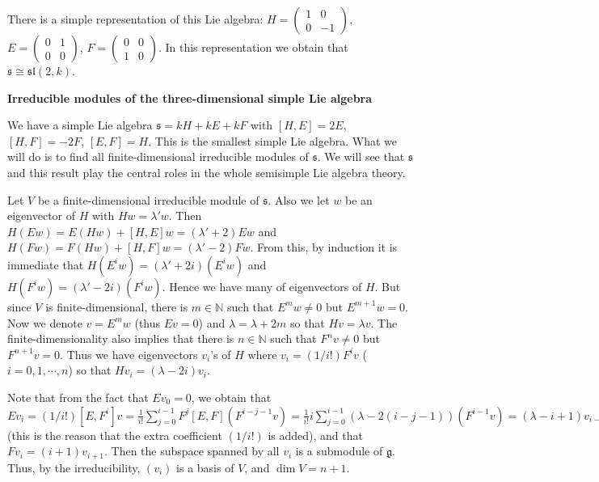 \documentclass{article}
\newcommand{\NaN}{\mathbb{N}}
\newcommand{\lie}[1]{\mathfrak{#1}}
\begin{document}
There is a simple representation of this Lie algebra: $H = \left( \begin{array}{rr} 1 & 0 \\ 0 & -1 \end{array} \right)$, $E = \left( \begin{array}{rr} 0 & 1 \\ 0 & 0 \end{array} \right)$, $F = \left( \begin{array}{rr} 0 & 0 \\ 1 & 0 \end{array} \right)$.
In this representation we obtain that $\lie{s} \cong \lie{sl}(2, k)$.

\newpage

\textbf{Irreducible modules of the three-dimensional simple Lie algebra}

We have a simple Lie algebra $\lie{s} = kH + kE + kF$ with $[H, E] = 2E$, $[H, F] = -2F$, $[E, F] = H$.
This is the smallest simple Lie algebra.
What we will do is to find all finite-dimensional irreducible modules of $\lie{s}$.
We will see that $\lie{s}$ and this result play the central roles in the whole semisimple Lie algebra theory.

Let $V$ be a finite-dimensional irreducible module of $\lie{s}$.
Also we let $w$ be an eigenvector of $H$ with $Hw = \lambda' w$.
Then $H(Ew) = E(Hw) + [H, E]w = (\lambda' + 2)Ew$ and $H(Fw) = F(Hw) + [H, F]w = (\lambda' - 2)Fw$.
From this, by induction it is immediate that $H(E^i w) = (\lambda' + 2i) (E^i w)$ and $H(F^i w) = (\lambda' - 2i) (F^i w)$.
Hence we have many of eigenvectors of $H$.
But since $V$ is finite-dimensional, there is $m \in \NaN$ such that $E^m w \ne 0$ but $E^{m + 1} w = 0$.
Now we denote $v = E^m w$ (thus $Ev = 0$) and $\lambda = \lambda + 2m$ so that $Hv = \lambda v$.
The finite-dimensionality also implies that there is $n \in \NaN$ such that $F^n v \ne 0$ but $F^{n + 1} v = 0$.
Thus we have eigenvectors $v_i$'s of $H$ where $v_i = (1/i!) F^i v$ ($i = 0, 1, \cdots, n$) so that $Hv_i = (\lambda - 2i) v_i$.

Note that from the fact that $Ev_0 = 0$, we obtain that $Ev_i = (1/i!) [E, F^i]v = \frac{1}{i!} \sum_{j = 0}^{i - 1} F^j [E, F](F^{i - j - 1} v) = \frac{1}{i!} i \sum_{j = 0}^{i - 1} (\lambda - 2(i - j - 1)) (F^{i - 1} v) = (\lambda - i + 1) v_{i - 1}$ (this is the reason that the extra coefficient $(1/i!)$ is added), and that $Fv_i = (i + 1) v_{i + 1}$. Then the subspace spanned by all $v_i$ is a submodule of $\lie{g}$.
Thus, by the irreducibility, $(v_i)$ is a basis of $V$, and $\dim{V} = n + 1$.
\end{document}
